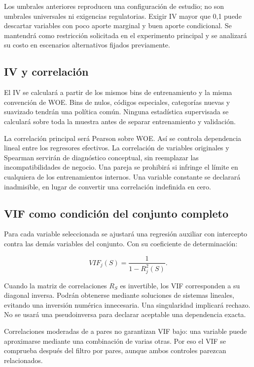\documentclass[11pt,letterpaper]{article}
\begin{document}
Los umbrales anteriores reproducen una configuración de estudio; no son umbrales universales ni exigencias regulatorias. Exigir IV mayor que 0,1 puede descartar variables con poco aporte marginal y buen aporte condicional. Se mantendrá como restricción solicitada en el experimento principal y se analizará su costo en escenarios alternativos fijados previamente.

\subsection{IV y correlación}\label{sec:5.1}

El IV se calculará a partir de los mismos bins de entrenamiento y la misma convención de WOE. Bins de nulos, códigos especiales, categorías nuevas y suavizado tendrán una política común. Ninguna estadística supervisada se calculará sobre toda la muestra antes de separar entrenamiento y validación.

La correlación principal será Pearson sobre WOE. Así se controla dependencia lineal entre los regresores efectivos. La correlación de variables originales y Spearman servirán de diagnóstico conceptual, sin reemplazar las incompatibilidades de negocio. Una pareja se prohibirá si infringe el límite en cualquiera de los entrenamientos internos. Una variable constante se declarará inadmisible, en lugar de convertir una correlación indefinida en cero.

\subsection{VIF como condición del conjunto completo}\label{sec:5.2}

Para cada variable seleccionada se ajustará una regresión auxiliar con intercepto contra las demás variables del conjunto. Con su coeficiente de determinación:

\[
VIF_j(S)=\frac{1}{1-R_j^2(S)}.
\]

Cuando la matriz de correlaciones \(R_S\) es invertible, los VIF corresponden a su diagonal inversa. Podrán obtenerse mediante soluciones de sistemas lineales, evitando una inversión numérica innecesaria. Una singularidad implicará rechazo. No se usará una pseudoinversa para declarar aceptable una dependencia exacta.

Correlaciones moderadas de a pares no garantizan VIF bajo: una variable puede aproximarse mediante una combinación de varias otras. Por eso el VIF se comprueba después del filtro por pares, aunque ambos controles parezcan relacionados.
\end{document}
